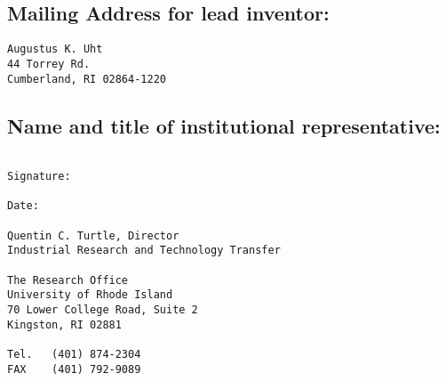 \documentclass[10pt,dvips]{article}
\begin{document}
\subsection{Mailing Address for lead inventor:}

\begin{verbatim}
Augustus K. Uht
44 Torrey Rd.
Cumberland, RI 02864-1220
\end{verbatim}

\subsection{Name and title of institutional representative:}

\begin{verbatim}

Signature:

Date:

Quentin C. Turtle, Director
Industrial Research and Technology Transfer

The Research Office
University of Rhode Island
70 Lower College Road, Suite 2
Kingston, RI 02881

Tel.   (401) 874-2304
FAX    (401) 792-9089
\end{verbatim}
\end{document}

